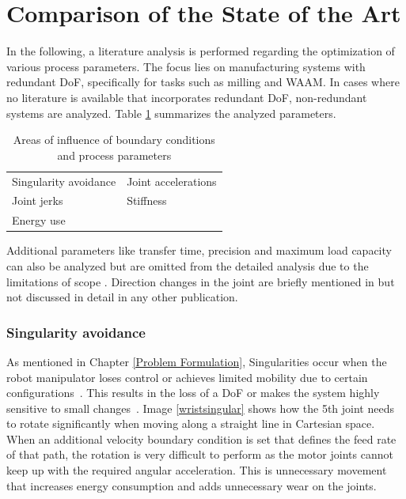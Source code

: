 \section{Comparison of the State of the Art }%

In the following, a literature analysis is performed regarding the optimization of various process parameters. The focus lies on manufacturing systems with redundant DoF, specifically for tasks such as milling and WAAM. In cases where no literature is available that incorporates redundant DoF, non-redundant systems are analyzed.
Table \ref{parameter} summarizes the analyzed parameters. 


\begin{table} [h!]
	\centering
	\begin{tabular}{|l|l|}
		\hline
		\hline
		Singularity avoidance \cite{Huo.2008} & Joint accelerations \cite{Gasparetto.2010}\\
		Joint jerks \cite{Gasparetto.2010} & Stiffness \cite{Cvitanic.2020} \\
		Energy use \cite{Paryanto.2015} & \\
		\hline
		\hline
		
	\end{tabular}
	
	
	\caption{Areas of influence of boundary conditions and process parameters}
	\label{parameter}
\end{table}

Additional parameters like transfer time, precision and maximum load capacity can also be analyzed but are omitted from the detailed analysis due to the limitations of scope \cite{Breaz.2017, Hirzinger.2005, Pham.2018}. Direction changes in the joint are briefly mentioned in \cite{Halbauer.2013} but not discussed in detail in any other publication.

\subsubsection{Singularity avoidance}
As mentioned in Chapter \ref{Problem Formulation}, Singularities occur when the robot manipulator loses control or achieves limited mobility due to certain configurations~\cite{Malyshev.2022}. This results in the loss of a DoF or makes the system highly sensitive to small changes~\cite{Zhao.2021, Milenkovic.2021}.
Image \ref{wristsingular} shows how the 5th joint needs to rotate significantly when moving along a straight line in Cartesian space. When an additional velocity boundary condition is set that defines the feed rate of that path, the rotation is very difficult to perform as the motor joints cannot keep up with the required angular acceleration. This is unnecessary movement that increases energy consumption and adds unnecessary wear on the joints. 



